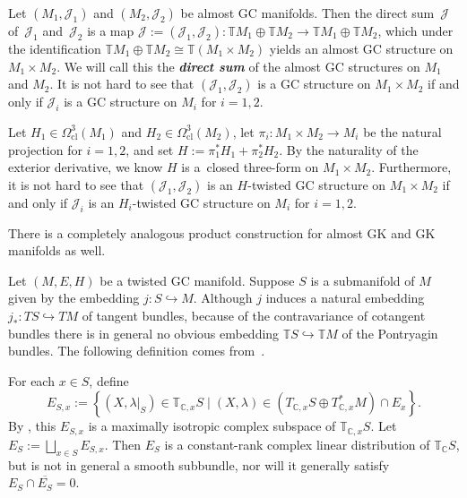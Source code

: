 \documentclass[11pt]{article}
\numberwithin{equation}{section}
\newcommand{\deff}[1]{\textbf{\emph{#1}}}
\newcommand{\func}[3]{#1 \colon #2 \to #3}
\newcommand{\hookfunc}[3]{#1 \colon #2 \hookrightarrow #3}
\newcommand{\pont}[1]{\mathbb{T} {#1}}
\newcommand{\cpont}[1]{\mathbb{T}_{\mathbb{C}} {#1}}
\newcommand{\tang}{T}
\begin{document}
\begin{Example} \label{example2}
Let $(M_1,\mathcal{J}_1)$ and $(M_2,\mathcal{J}_2)$ be almost GC manifolds.  Then the direct sum~$\mathcal{J}$ of~$\mathcal{J}_1$ and~$\mathcal{J}_2$ is a map
  $
    \func{\mathcal{J}:=(\mathcal{J}_1, \mathcal{J}_2)}{
    \pont{M_1} \oplus \pont{M_2}
    }{
    \pont{M_1} \oplus \pont{M_2}
    }
  $,
which under the identif\/ication
  $
    \pont{M_1} \oplus \pont{M_2}
    \cong
    \pont{(M_1 \times M_2)}
  $
yields an almost GC structure on $M_1 \times M_2$.  We will call this the \deff{direct sum} of the almost GC structures on $M_1$ and $M_2$.  It is not hard to see that $(\mathcal{J}_1,\mathcal{J}_2)$ is a GC structure on $M_1 \times M_2$ if and only if $\mathcal{J}_i$ is a GC structure on $M_i$ for $i=1,2$.

Let $H_1 \in \Omega_{\text{cl}}^3(M_1)$ and $H_2 \in \Omega_{\text{cl}}^3(M_2)$, let $\func{\pi_i}{M_1 \times M_2}{M_i}$ be the natural projection for $i=1,2$, and set
$
  H := \pi_1^* H_1 + \pi_2^* H_2
$.
By the naturality of the exterior derivative, we know $H$ is a~closed three-form on $M_1 \times M_2$.  Furthermore, it is not hard to see that $(\mathcal{J}_1,\mathcal{J}_2)$ is an $H$-twisted GC structure on $M_1 \times M_2$ if and only if $\mathcal{J}_i$ is an $H_i$-twisted GC structure on $M_i$ for $i=1,2$.


There is a completely analogous product construction for almost GK and GK  manifolds as well.
\end{Example}


Let $(M,E,H)$ be a twisted GC manifold.  Suppose $S$ is a submanifold of $M$ given by the embedding $\hookfunc{j}{S}{M}$. Although $j$ induces a natural embedding $\hookfunc{j_*}{\tang S}{\tang M}$ of tangent bundles, because of the contravariance of cotangent bundles there is in general no obvious embedding $\pont{S} \hookrightarrow \pont{M}$ of the Pontryagin bundles.  The following def\/inition comes from~\cite{benbassat}.

For each $x \in S$, def\/ine
  \[
    E_{S,x}
    :=
    \left\{ \left( X, \lambda|_{S} \right) \in
    \mathbb{T}_{\mathbb{C},x} S
    \mid (X, \lambda) \in (\tang_{\mathbb{C},x} S \oplus \tang_{\mathbb{C},x}^* M ) \cap E_x \right\}.
  \]
By \cite[Lemma 8.2]{benbassat}, this $E_{S,x}$ is a maximally isotropic complex subspace of $\mathbb{T}_{\mathbb{C}, x} S$.
Let $E_S := \bigsqcup_{x \in S} E_{S, x}$.  Then $E_S$ is a constant-rank complex linear distribution of $\cpont{S}$, but is not in general a smooth subbundle, nor will it generally satisfy $E_S \cap \overline{E_S} = 0$.
\end{document}
